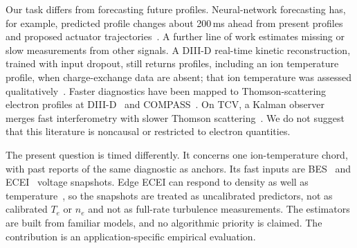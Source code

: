 Our task differs from forecasting future profiles. Neural-network forecasting has, for example, predicted profile changes about 200\,ms ahead from present profiles and proposed actuator trajectories~\citep{Abbate2021DatadrivenProfile}. A further line of work estimates missing or slow measurements from other signals. A DIII-D real-time kinetic reconstruction, trained with input dropout, still returns profiles, including an ion temperature profile, when charge-exchange data are absent; that ion temperature was assessed qualitatively~\citep{Shousha2023MachineLearningbased}. Faster diagnostics have been mapped to Thomson-scattering electron profiles at DIII-D~\citep{Jalalvand2025MultimodalSuperresolution} and COMPASS~\citep{Imrek2026TemporalSuperresolution}. On TCV, a Kalman observer merges fast interferometry with slower Thomson scattering~\citep{Pastore2023ModelBased}. We do not suggest that this literature is noncausal or restricted to electron quantities.

The present question is timed differently. It concerns one ion-temperature chord, with past reports of the same diagnostic as anchors. Its fast inputs are BES~\citep{Lampert2015CombinedHydrogen} and ECEI~\citep{Yun2014Quasi3d} voltage snapshots. Edge ECEI can respond to density as well as temperature~\citep{Vanovac2018EffectsDensity}, so the snapshots are treated as uncalibrated predictors, not as calibrated $T_e$ or $n_e$ and not as full-rate turbulence measurements. The estimators are built from familiar models, and no algorithmic priority is claimed. The contribution is an application-specific empirical evaluation.
